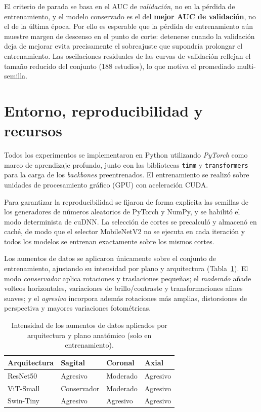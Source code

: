 El criterio de parada se basa en el AUC de \textit{validación}, no en la pérdida de entrenamiento, y el modelo conservado es el del \textbf{mejor AUC de validación}, no el de la última época. Por ello es esperable que la pérdida de entrenamiento aún muestre margen de descenso en el punto de corte: detenerse cuando la validación deja de mejorar evita precisamente el sobreajuste que supondría prolongar el entrenamiento. Las oscilaciones residuales de las curvas de validación reflejan el tamaño reducido del conjunto (188 estudios), lo que motiva el promediado multi-semilla.

\section{Entorno, reproducibilidad y recursos}
\label{sec:entorno}

Todos los experimentos se implementaron en Python utilizando \textit{PyTorch} como marco de aprendizaje profundo, junto con las bibliotecas \texttt{timm} y \texttt{transformers} para la carga de los \textit{backbones} preentrenados. El entrenamiento se realizó sobre unidades de procesamiento gráfico (GPU) con aceleración CUDA.

Para garantizar la reproducibilidad se fijaron de forma explícita las semillas de los generadores de números aleatorios de PyTorch y NumPy, y se habilitó el modo determinista de cuDNN. La selección de cortes se precalculó y almacenó en caché, de modo que el selector MobileNetV2 no se ejecuta en cada iteración y todos los modelos se entrenan exactamente sobre los mismos cortes.

Los aumentos de datos se aplicaron únicamente sobre el conjunto de entrenamiento, ajustando su intensidad por plano y arquitectura (Tabla~\ref{tab:augmentation}). El modo \textit{conservador} aplica rotaciones y traslaciones pequeñas; el \textit{moderado} añade volteos horizontales, variaciones de brillo/contraste y transformaciones afines suaves; y el \textit{agresivo} incorpora además rotaciones más amplias, distorsiones de perspectiva y mayores variaciones fotométricas.

\begin{table}[H]
\centering
\small
\caption{Intensidad de los aumentos de datos aplicados por arquitectura y plano anatómico (solo en entrenamiento).}
\label{tab:augmentation}
\begin{tabularx}{\textwidth}{
>{\raggedright\arraybackslash}X
>{\centering\arraybackslash}m{2.6cm}
>{\centering\arraybackslash}m{2.6cm}
>{\centering\arraybackslash}m{2.6cm}
}
\toprule
\textbf{Arquitectura} & \textbf{Sagital} & \textbf{Coronal} & \textbf{Axial} \\
\midrule
ResNet50   & Agresivo    & Moderado & Agresivo \\
ViT-Small  & Conservador & Moderado & Agresivo \\
Swin-Tiny  & Agresivo    & Agresivo & Agresivo \\
\bottomrule
\end{tabularx}
\end{table}
